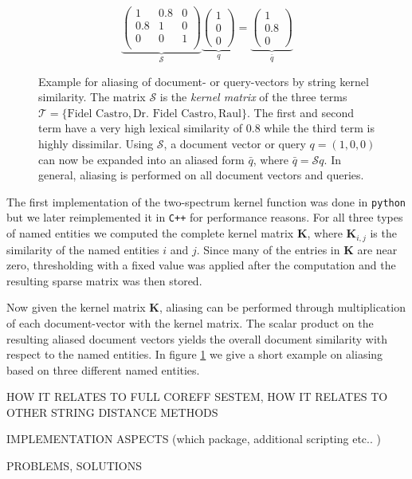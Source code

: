 \begin{figure}[ht]
  \caption{Example for aliasing of document- or query-vectors by string kernel similarity.
The matrix $\mathcal{S}$ is the \textit{kernel matrix} of the three terms $\mathcal{T} = \lbrace
\text{Fidel Castro},\text{Dr. Fidel Castro}, \text{Raul}\rbrace$. The first and second term have a
very high lexical similarity of $0.8$ while the third term is highly dissimilar. Using
$\mathcal{S}$, a document vector or query $q=(1,0,0)$ can now be expanded into an aliased form
$\bar q$, where $\bar q = \mathcal{S}q$. In general, aliasing is performed on all document vectors
and queries.}
  \[
     \underbrace{\begin{pmatrix}
      1   & 0.8 & 0\\
      0.8 & 1   & 0\\
      0   & 0   & 1\\
     \end{pmatrix}}_{\mathcal{S}}
     \underbrace{\begin{pmatrix}
     1\\ 0\\0 
     \end{pmatrix}}_{q}
     =
     \underbrace{\begin{pmatrix}
     1\\ 0.8\\0 
     \end{pmatrix}}_{\bar q}
  \]
  \label{eq:example_string_sim}
\end{figure}


The first implementation of the two-spectrum kernel function was done in \texttt{python} but we  later reimplemented it in \texttt{C++} for performance reasons. For all three types of named entities we computed the complete kernel matrix $\textbf{K}$, where $\textbf{K}_{i,j}$ is the similarity of the named entities $i$ and $j$. Since many of the entries in $\textbf{K}$ are near zero, thresholding with a fixed value was applied after the computation and the resulting sparse matrix was then stored.

Now given the kernel matrix $\textbf{K}$, aliasing can be performed through multiplication of each document-vector with the kernel matrix. The scalar product on the resulting aliased document vectors yields the overall document similarity with respect to the named entities. In figure \ref{eq:example_string_sim} we give a short example on aliasing based on three different named entities.





HOW IT RELATES TO FULL COREFF SESTEM, HOW IT RELATES TO OTHER STRING DISTANCE METHODS

IMPLEMENTATION ASPECTS (which package, additional scripting etc.. )

PROBLEMS, SOLUTIONS



